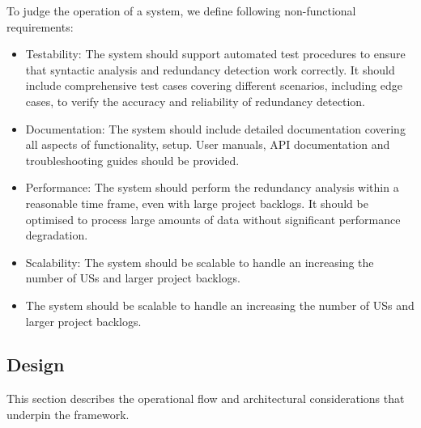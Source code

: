 To judge the operation of a system, we define following non-functional requirements:
\begin{itemize}
	\item Testability: The system should support automated test procedures to ensure that syntactic analysis and redundancy detection work correctly. It should include comprehensive test cases covering different scenarios, including edge cases, to verify the accuracy and reliability of redundancy detection.
	
	\item Documentation: The system should include detailed documentation covering all aspects of functionality, setup. User manuals, API documentation and troubleshooting guides should be provided. 
	
	\item Performance: The system should perform the redundancy analysis within a reasonable time frame, even with large project backlogs. It should be optimised to process large amounts of data without significant performance degradation.
	
	\item Scalability: The system should be scalable to handle an increasing the number of USs and larger project backlogs.
	
	\item The system should be scalable to handle an increasing the number of USs and larger project backlogs.
	

\end{itemize}
\subsection{Design}\label{desing}

This section describes the operational flow and architectural considerations that underpin the framework.

